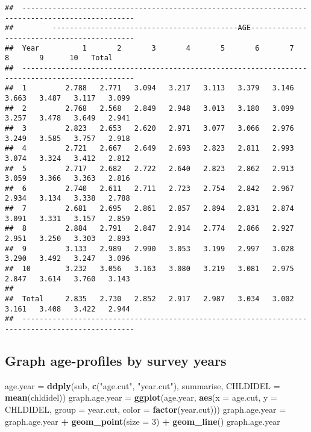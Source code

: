 \documentclass[]{article}
\newenvironment{Shaded}{\begin{snugshade}}{\end{snugshade}}
\newcommand{\DataTypeTok}[1]{\textcolor[rgb]{0.13,0.29,0.53}{#1}}
\newcommand{\DecValTok}[1]{\textcolor[rgb]{0.00,0.00,0.81}{#1}}
\newcommand{\KeywordTok}[1]{\textcolor[rgb]{0.13,0.29,0.53}{\textbf{#1}}}
\newcommand{\NormalTok}[1]{#1}
\newcommand{\OperatorTok}[1]{\textcolor[rgb]{0.81,0.36,0.00}{\textbf{#1}}}
\newcommand{\StringTok}[1]{\textcolor[rgb]{0.31,0.60,0.02}{#1}}
\begin{document}
\begin{verbatim}
##  ------------------------------------------------------------------------------------------------ 
##         -------------------------------------------AGE------------------------------------------- 
##  Year          1       2       3       4       5       6       7       8       9      10   Total  
##  ------------------------------------------------------------------------------------------------ 
##  1         2.788   2.771   3.094   3.217   3.113   3.379   3.146   3.663   3.487   3.117   3.099  
##  2         2.768   2.568   2.849   2.948   3.013   3.180   3.099   3.257   3.478   3.649   2.941  
##  3         2.823   2.653   2.620   2.971   3.077   3.066   2.976   3.249   3.585   3.757   2.918  
##  4         2.721   2.667   2.649   2.693   2.823   2.811   2.993   3.074   3.324   3.412   2.812  
##  5         2.717   2.682   2.722   2.640   2.823   2.862   2.913   3.059   3.366   3.363   2.816  
##  6         2.740   2.611   2.711   2.723   2.754   2.842   2.967   2.934   3.134   3.338   2.788  
##  7         2.681   2.695   2.861   2.857   2.894   2.831   2.874   3.091   3.331   3.157   2.859  
##  8         2.884   2.791   2.847   2.914   2.774   2.866   2.927   2.951   3.250   3.303   2.893  
##  9         3.133   2.989   2.990   3.053   3.199   2.997   3.028   3.290   3.492   3.247   3.096  
##  10        3.232   3.056   3.163   3.080   3.219   3.081   2.975   2.847   3.614   3.760   3.143  
##                                                                                                   
##  Total     2.835   2.730   2.852   2.917   2.987   3.034   3.002   3.161   3.408   3.422   2.944  
##  ------------------------------------------------------------------------------------------------
\end{verbatim}

\hypertarget{graph-age-profiles-by-survey-years}{%
\subsection{Graph age-profiles by survey
years}\label{graph-age-profiles-by-survey-years}}

\begin{Shaded}
\begin{Highlighting}[]
\NormalTok{age.year =}\StringTok{ }\KeywordTok{ddply}\NormalTok{(sub, }\KeywordTok{c}\NormalTok{(}\StringTok{"age.cut"}\NormalTok{, }\StringTok{"year.cut"}\NormalTok{), summarise, }\DataTypeTok{CHLDIDEL =} \KeywordTok{mean}\NormalTok{(chldidel))}
\NormalTok{graph.age.year =}\StringTok{ }\KeywordTok{ggplot}\NormalTok{(age.year, }\KeywordTok{aes}\NormalTok{(}\DataTypeTok{x =}\NormalTok{ age.cut, }\DataTypeTok{y =}\NormalTok{ CHLDIDEL, }\DataTypeTok{group =}\NormalTok{ year.cut, }\DataTypeTok{color =} \KeywordTok{factor}\NormalTok{(year.cut)))}
\NormalTok{graph.age.year =}\StringTok{ }\NormalTok{graph.age.year }\OperatorTok{+}\StringTok{ }\KeywordTok{geom_point}\NormalTok{(}\DataTypeTok{size =} \DecValTok{3}\NormalTok{) }\OperatorTok{+}\StringTok{ }\KeywordTok{geom_line}\NormalTok{()}
\NormalTok{graph.age.year}
\end{Highlighting}
\end{Shaded}
\end{document}
